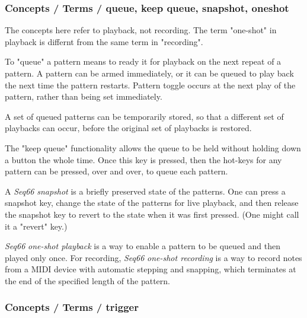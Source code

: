 \subsubsection{Concepts / Terms / queue, keep queue, snapshot, oneshot}
\label{subsubsec:concepts_terms_queue_mode}

   The concepts here refer to playback, not recording.  The term "one-shot" in
   playback is differnt from the same term in "recording".

   To "queue" a pattern means to ready it for playback on the next repeat of
   a pattern.  A pattern can be armed immediately, or it can be queued to
   play back the next time the pattern restarts.
   Pattern toggle occurs at the next play of the pattern,
   rather than being set immediately.

   A set of queued patterns can be temporarily stored, so that a different
   set of playbacks can occur, before the original set of playbacks is
   restored.

   The "keep queue" functionality allows the queue to be held without
   holding down a button the whole time.  Once this key is pressed,
   then the hot-keys for any pattern can be pressed, over and over,
   to queue each pattern.

   A \textsl{Seq66} \textsl{snapshot} is a briefly preserved
   state of the patterns.  One can press a snapshot key, change the state of
   the patterns for live playback, and then release the snapshot key to
   revert to the state when it was first pressed.  (One might call it a
   "revert" key.)

   \textsl{Seq66} \textsl{one-shot playback} is a way to enable a pattern to be
   queued and then played only once.
   For recording, 
   \textsl{Seq66} \textsl{one-shot recording} is a way to record notes from a
   MIDI device with automatic stepping and snapping, which terminates at the
   end of the specified length of the pattern.

\subsubsection{Concepts / Terms / trigger}
\label{subsubsec:concepts_terms_trigger}


